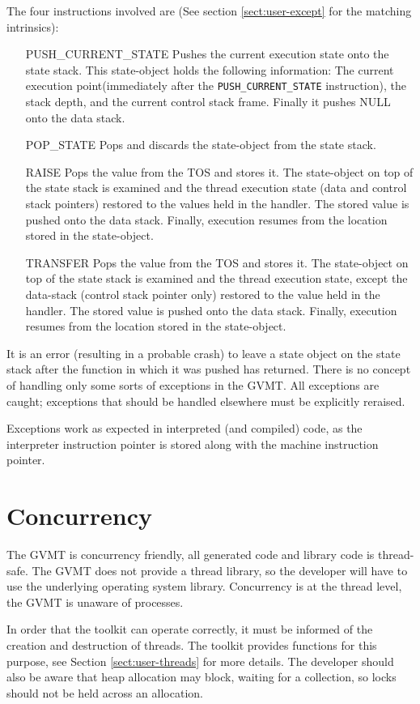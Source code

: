 The four instructions involved are (See section \ref{sect:user-except} for the matching intrinsics):
\begin{itemize}
\item [PUSH\_CURRENT\_STATE] Pushes the current execution state onto the state stack. This state-object holds the following information: The current execution point(immediately after the \verb|PUSH_CURRENT_STATE| instruction), the stack depth, and the current control stack frame. Finally it pushes NULL onto the data stack. 
\item [POP\_STATE] Pops and discards the state-object from the state stack.
\item [RAISE] Pops the value from the TOS and stores it. The state-object on top of the state stack is examined and the thread execution state (data and control stack pointers) restored to the values held in the handler. The stored value is pushed onto the data stack. Finally, execution resumes from the location stored in the state-object.
\item [TRANSFER] Pops the value from the TOS and stores it. The state-object on top of the state stack is examined and the thread execution state, except the data-stack (control stack pointer only) restored to the value held in the handler. The stored value is pushed onto the data stack. Finally, execution resumes from the location stored in the state-object.
\end{itemize}
It is an error (resulting in a probable crash) to leave a state object on the state stack after the function in which it was pushed has returned.
There is no concept of handling only some sorts of exceptions in the GVMT. All exceptions are caught; exceptions that should be handled elsewhere must be explicitly reraised. 

Exceptions work as expected in interpreted (and compiled) code, as the interpreter instruction pointer is stored along with the machine instruction pointer.

\section{Concurrency\label{sect:conc}}

The GVMT is concurrency friendly, all generated code and library code is thread-safe. The GVMT does not provide a thread library, so the developer will have to use the underlying operating system library.
Concurrency is at the thread level, the GVMT is unaware of processes.

In order that the toolkit can operate correctly, it must be informed of the creation and destruction of threads.
The toolkit provides functions for this purpose, see Section \ref{sect:user-threads} for more details.
The developer should also be aware that heap allocation may block, waiting for a collection, so locks should not be held across an allocation.

